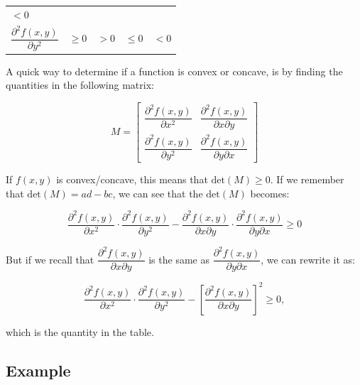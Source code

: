 \documentclass[11pt]{article}
\begin{document}
\begin{longtable}[]{@{}lllll@{}}
\begin{minipage}[t]{0.17\columnwidth}
\(< 0\)\strut
\end{minipage}\tabularnewline
\begin{minipage}[t]{0.17\columnwidth}\raggedright
\(\dfrac{\partial^2 f(x,y)}{\partial y^2}\)\strut
\end{minipage} & \begin{minipage}[t]{0.17\columnwidth}\raggedright
\(\geq 0\)\strut
\end{minipage} & \begin{minipage}[t]{0.17\columnwidth}\raggedright
\(>0\)\strut
\end{minipage} & \begin{minipage}[t]{0.17\columnwidth}\raggedright
\(\leq 0\)\strut
\end{minipage} & \begin{minipage}[t]{0.17\columnwidth}\raggedright
\(< 0\)\strut
\end{minipage}\tabularnewline
\bottomrule
\end{longtable}

    A quick way to determine if a function is convex or concave, is by
finding the quantities in the following matrix:

\[ M = \begin{bmatrix} \dfrac{\partial^2 f(x,y)}{\partial x^2} & \dfrac{\partial^2 f(x,y)}{\partial x \partial y} \\ \dfrac{\partial^2 f(x,y)}{\partial y^2} & \dfrac{\partial^2 f(x,y)}{\partial y \partial x}  \end{bmatrix} \]

    If \(f(x,y)\) is convex/concave, this means that
\(\textrm{det}(M) \geq 0\). If we remember that
\(\text{det}(M) = ad-bc\), we can see that the \(\textrm{det}(M)\)
becomes:

\[ \dfrac{\partial^2 f(x,y)}{\partial x^2} \cdot \dfrac{\partial^2 f(x,y)}{\partial y^2} - \dfrac{\partial^2 f(x,y)}{\partial x \partial y} \cdot \dfrac{\partial^2 f(x,y)}{\partial y \partial x}  \geq 0 \]

    But if we recall that
\(\dfrac{\partial^2 f(x,y)}{\partial x \partial y}\) is the same as
\(\dfrac{\partial^2 f(x,y)}{\partial y \partial x}\), we can rewrite it
as:

\[ \dfrac{\partial^2 f(x,y)}{\partial x^2} \cdot \dfrac{\partial^2 f(x,y)}{\partial y^2} - \left[\dfrac{\partial^2 f(x,y)}{\partial x \partial y}\right]^2 \geq 0,\]

which is the quantity in the table.

    \hypertarget{example}{%
\subsection{Example}\label{example}}
\end{document}
